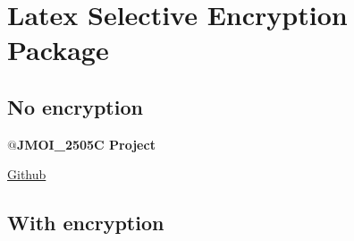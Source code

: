 \documentclass{article}
\begin{document}
\section{Latex Selective Encryption Package}

\subsection{No encryption}

\textbf{$@$JMOI\_2505C Project}

\href{https://github.com/}{Github}

\subsection{With encryption}

\textbf{}

\end{document}
